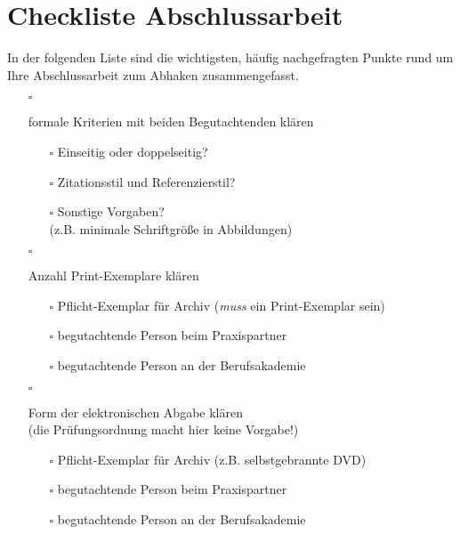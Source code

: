 \pagestyle{empty}
\cleardoublepage
{}
\chapter*{Checkliste Abschlussarbeit}
In der folgenden Liste sind die wichtigsten, häufig nachgefragten Punkte rund um Ihre Abschlussarbeit zum Abhaken zusammengefasst.


\begin{itemize}
    \item[$\square$]{
        formale Kriterien mit beiden Begutachtenden klären
        \begin{itemize}
            \item[$\square$] Einseitig oder doppelseitig?
            \item[$\square$] Zitationsstil und Referenzierstil?
            \item[$\square$]{
                Sonstige Vorgaben?\\
                (z.B. minimale Schriftgröße in Abbildungen)
            }
        \end{itemize}
    }
    \item[$\square$]{
        Anzahl Print-Exemplare klären
        \begin{itemize}
            \item[$\square$] Pflicht-Exemplar für Archiv (\emph{muss} ein Print-Exemplar sein)
            \item[$\square$] begutachtende Person beim Praxispartner
            \item[$\square$] begutachtende Person an der Berufsakademie
        \end{itemize}
    }
    \item[$\square$]{
        Form der elektronischen Abgabe klären\\
        (die Prüfungsordnung macht hier keine Vorgabe!)
        \begin{itemize}
            \item[$\square$] Pflicht-Exemplar für Archiv (z.B. selbstgebrannte DVD)
            \item[$\square$] begutachtende Person beim Praxispartner
            \item[$\square$] begutachtende Person an der Berufsakademie

\end{itemize}}
\end{itemize}
